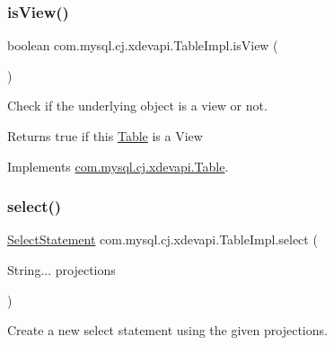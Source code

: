 \mbox{\label{classcom_1_1mysql_1_1cj_1_1xdevapi_1_1_table_impl_a92b2db897ad5ce4f950422956bfc4027}} 
\subsubsection{\texorpdfstring{is\+View()}{isView()}}
{\footnotesize\ttfamily boolean com.\+mysql.\+cj.\+xdevapi.\+Table\+Impl.\+is\+View (\begin{DoxyParamCaption}{ }\end{DoxyParamCaption})}

Check if the underlying object is a view or not.

\begin{DoxyReturn}{Returns}
true if this \mbox{\hyperlink{interfacecom_1_1mysql_1_1cj_1_1xdevapi_1_1_table}{Table}} is a View 
\end{DoxyReturn}


Implements \mbox{\hyperlink{interfacecom_1_1mysql_1_1cj_1_1xdevapi_1_1_table_a17dc243982bdbd3c0024699d3fb5bd5e}{com.\+mysql.\+cj.\+xdevapi.\+Table}}.

\mbox{\label{classcom_1_1mysql_1_1cj_1_1xdevapi_1_1_table_impl_a048429d90cca804cd60ce9a49f5b12fd}} 
\subsubsection{\texorpdfstring{select()}{select()}}
{\footnotesize\ttfamily \mbox{\hyperlink{interfacecom_1_1mysql_1_1cj_1_1xdevapi_1_1_select_statement}{Select\+Statement}} com.\+mysql.\+cj.\+xdevapi.\+Table\+Impl.\+select (\begin{DoxyParamCaption}\item[{String...}]{projections }\end{DoxyParamCaption})}

Create a new select statement using the given projections.


